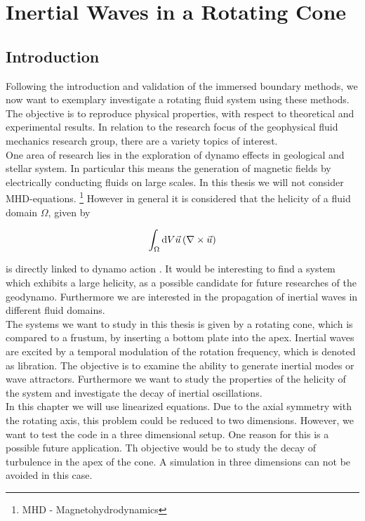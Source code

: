 \chapter{Inertial Waves in a Rotating Cone}

\section{Introduction}

Following the introduction and validation of the immersed boundary methods,
we now want to exemplary investigate a rotating fluid system using these methods.
The objective is to reproduce  physical properties, with respect to theoretical and experimental results.
In relation to the research focus of the geophysical fluid mechanics research group, there are a variety
topics of interest.\\
One area of research lies in the exploration of dynamo effects in geological and stellar system.
In particular this means the generation of magnetic fields by electrically conducting fluids on large scales.
In this thesis we will not consider MHD-equations.  \footnote{MHD - Magnetohydrodynamics}
However in general it is considered that the helicity of a fluid domain $\Omega$, given by

\begin{align}
    \int_{\Omega}\mathop{}\!\mathrm{d} V  \vec{u} \left( \nabla \times \vec{u} \right)
\end{align}

is directly linked to dynamo action \citep{moffat1978}.
It would be interesting to find a system which exhibits a large helicity,
as a possible candidate for future researches of the geodynamo.
Furthermore we are interested in the propagation of inertial waves in different fluid domains.\\
The systems we want to study in this thesis is given by a rotating cone, which is compared to
a frustum, by inserting a bottom plate into the apex.
Inertial waves are excited by a temporal modulation of the rotation frequency, which is denoted as libration.
The objective is to examine the ability to generate inertial modes or wave attractors.
Furthermore we want to study the properties of the helicity of the system and investigate the
decay of inertial oscillations.\\
In this chapter we will use linearized equations. Due to the axial symmetry with the rotating axis,
this problem could be reduced to two dimensions.
However, we want to test the code in a three dimensional setup.
One reason for this is a possible future application.
Th objective would be to study the decay of turbulence in the apex of the cone.
A simulation in three dimensions can not be avoided in this case.

